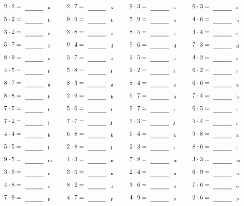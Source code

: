 \documentclass
[
  draft    = true,
  fontsize = 11pt,
  parskip  = half-
]
{scrartcl}
\begin{document}
\par\vfill\par
\begin{align*}
    \pline{2\cdot2}&=\rline{a}
  & \pline{2\cdot7}&=\rline{a}
  & \pline{9\cdot3}&=\rline{a}
  & \pline{6\cdot3}&=\rline{a} \\[1ex]
    \pline{5\cdot2}&=\rline{b}
  & \pline{9\cdot9}&=\rline{b}
  & \pline{5\cdot9}&=\rline{b}
  & \pline{4\cdot6}&=\rline{b} \\[1ex]
    \pline{3\cdot2}&=\rline{c}
  & \pline{3\cdot8}&=\rline{c}
  & \pline{8\cdot5}&=\rline{c}
  & \pline{3\cdot4}&=\rline{c} \\[1ex]
    \pline{5\cdot7}&=\rline{d}
  & \pline{9\cdot4}&=\rline{d}
  & \pline{9\cdot6}&=\rline{d}
  & \pline{7\cdot3}&=\rline{d} \\[1ex]
    \pline{8\cdot9}&=\rline{e}
  & \pline{3\cdot7}&=\rline{e}
  & \pline{2\cdot5}&=\rline{e}
  & \pline{4\cdot2}&=\rline{e} \\[1ex]
    \pline{4\cdot5}&=\rline{f}
  & \pline{5\cdot8}&=\rline{f}
  & \pline{9\cdot2}&=\rline{f}
  & \pline{6\cdot2}&=\rline{f} \\[1ex]
    \pline{8\cdot7}&=\rline{g}
  & \pline{8\cdot3}&=\rline{g}
  & \pline{8\cdot4}&=\rline{g}
  & \pline{6\cdot6}&=\rline{g} \\[1ex]
    \pline{8\cdot8}&=\rline{h}
  & \pline{2\cdot9}&=\rline{h}
  & \pline{6\cdot7}&=\rline{h}
  & \pline{7\cdot4}&=\rline{h} \\[1ex]
    \pline{7\cdot5}&=\rline{i}
  & \pline{5\cdot6}&=\rline{i}
  & \pline{9\cdot7}&=\rline{i}
  & \pline{6\cdot5}&=\rline{i} \\[1ex]
    \pline{7\cdot2}&=\rline{j}
  & \pline{7\cdot7}&=\rline{j}
  & \pline{5\cdot3}&=\rline{j}
  & \pline{5\cdot4}&=\rline{j} \\[1ex]
    \pline{4\cdot4}&=\rline{k}
  & \pline{6\cdot8}&=\rline{k}
  & \pline{6\cdot4}&=\rline{k}
  & \pline{9\cdot8}&=\rline{k} \\[1ex]
    \pline{5\cdot5}&=\rline{l}
  & \pline{2\cdot8}&=\rline{l}
  & \pline{2\cdot3}&=\rline{l}
  & \pline{8\cdot6}&=\rline{l} \\[1ex]
    \pline{9\cdot5}&=\rline{m}
  & \pline{4\cdot3}&=\rline{m}
  & \pline{7\cdot8}&=\rline{m}
  & \pline{3\cdot3}&=\rline{m} \\[1ex]
    \pline{3\cdot9}&=\rline{n}
  & \pline{3\cdot5}&=\rline{n}
  & \pline{2\cdot4}&=\rline{n}
  & \pline{6\cdot9}&=\rline{n} \\[1ex]
    \pline{4\cdot8}&=\rline{o}
  & \pline{8\cdot2}&=\rline{o}
  & \pline{3\cdot6}&=\rline{o}
  & \pline{7\cdot6}&=\rline{o} \\[1ex]
    \pline{7\cdot9}&=\rline{p}
  & \pline{4\cdot7}&=\rline{p}
  & \pline{4\cdot9}&=\rline{p}
  & \pline{2\cdot6}&=\rline{p}
\end{align*}
\end{document}
